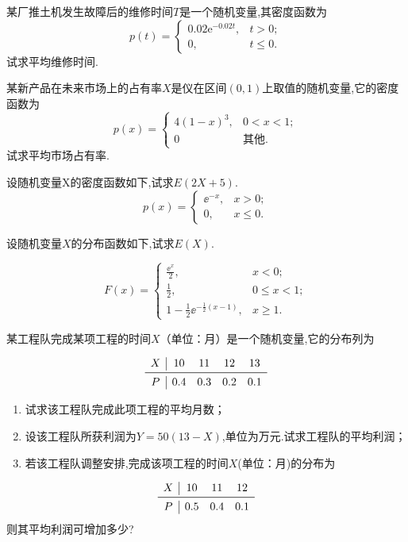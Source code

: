 \begin{xiti}
\item 某厂推土机发生故障后的维修时间$ T $是一个随机变量,其密度函数为
\[
  p(t) = \begin{cases}
     0.02 \mathrm{e}^{-0.02 t}, & t>0; \\
     0, & t \leqslant 0.
   \end{cases}
\]
试求平均维修时间.

\item 某新产品在未来市场上的占有率$X$是仪在区间$ (0,1) $上取值的随机变量,它的密度函数为
\[
  p(x) = \begin{cases}
    4(1-x)^{3}, & 0<x<1; \\
    0 & \text{其他.}
  \end{cases}
\]
试求平均市场占有率.

\item 设随机变量X的密度函数如下,试求$ E(2X+5) $.
\[
  p(x)=\begin{cases}
    \ee^{-x}, & x>0; \\
    0, & x \leqslant 0.
  \end{cases}
\]

\item 设随机变量$ X $的分布函数如下,试求$ E(X) $.

\[
  F(x) = \begin{cases}
    \frac{\ee^{x}}{2}, & x<0; \\
    \frac{1}{2}, & 0 \leqslant x<1; \\
    1-\frac{1}{2} \ee^{-\frac{1}{2}(x-1)}, & x \geqslant 1.
  \end{cases}
\]

\item 某工程队完成某项工程的时间$ X $（单位：月）是一个随机变量,它的分布列为

\[
  \begin{array}{c|cccc}
    X     & 10    & 11    & 12    & 13 \\\midrule
    P     & 0.4   & 0.3   & 0.2   & 0.1 \\
   \end{array}
\]
  \begin{enumerate}
    \item 试求该工程队完成此项工程的平均月数；
    \item 设该工程队所获利润为$ Y=50(13-X) $,单位为万元.试求工程队的平均利润；
    \item 若该工程队调整安排,完成该项工程的时间$ X $(单位：月)的分布为
  \end{enumerate}
\[
  \begin{array}{c|ccc}
    X & {10} & {11} & {12} \\ \midrule
    P & {0.5} & {0.4} & {0.1} \\
  \end{array}
\]
则其平均利润可增加多少?


\end{xiti}
